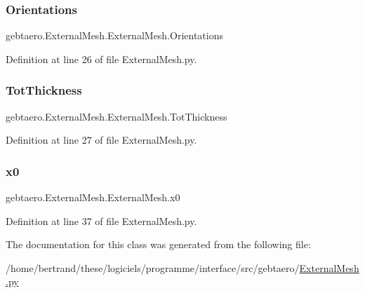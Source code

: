 \subsubsection{\texorpdfstring{Orientations}{Orientations}}
{\footnotesize\ttfamily gebtaero.\+External\+Mesh.\+External\+Mesh.\+Orientations}



Definition at line 26 of file External\+Mesh.\+py.

\mbox{\label{classgebtaero_1_1_external_mesh_1_1_external_mesh_a6e7c70282c461d0a68a05419bf152973}} 
\subsubsection{\texorpdfstring{Tot\+Thickness}{TotThickness}}
{\footnotesize\ttfamily gebtaero.\+External\+Mesh.\+External\+Mesh.\+Tot\+Thickness}



Definition at line 27 of file External\+Mesh.\+py.

\mbox{\label{classgebtaero_1_1_external_mesh_1_1_external_mesh_acaa3b125cb4f80848007b82426c14ffa}} 
\subsubsection{\texorpdfstring{x0}{x0}}
{\footnotesize\ttfamily gebtaero.\+External\+Mesh.\+External\+Mesh.\+x0}



Definition at line 37 of file External\+Mesh.\+py.



The documentation for this class was generated from the following file\+:\begin{DoxyCompactItemize}
\item 
/home/bertrand/these/logiciels/programme/interface/src/gebtaero/\hyperlink{_external_mesh_8py}{External\+Mesh.\+py}\end{DoxyCompactItemize}
